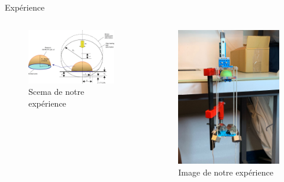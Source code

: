 \documentclass[aspectratio=169,xcolor=dvipsnames]{beamer}
\begin{document}
\begin{frame}{Expérience}
    \begin{columns}
        \begin{figure}
            \centering
            \includegraphics[width=0.95\textwidth]{contactHertzPhoto.png}
            \caption{Scema de notre expérience\cite{Wang2013}}
            \label{fig:wiki}
        \end{figure}
        \begin{figure}
            \centering
            \includegraphics[height=0.7\textheight]{Figures/IMG-20221205-WA0025.jpg}
            \caption{Image de notre expérience}
            \label{fig:my_label}
        \end{figure}
    \end{columns}
\end{frame}
\end{document}
